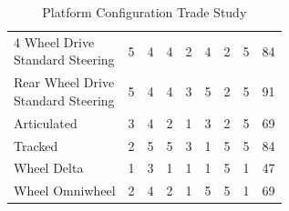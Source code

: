 \documentclass{article}
\begin{document}
\begin{table}[H]
\begin{adjustwidth}{-1.5in}{-1.5in}
\begin{tabular}{|l|c|c|c|c|c|c|c|c|}
		\makecell[l]{4 Wheel Drive \\ Standard Steering}    & 5     & 4                & 4         & 2                   & 4                 & 2                                          & 5                             & 84    \\ \hdashline
		\makecell[l]{Rear Wheel Drive \\ Standard Steering} & 5     & 4                & 4         & 3                   & 5                 & 2                                          & 5                             & 91    \\ \hdashline
		Articulated                        & 3     & 4                & 2         & 1                   & 3                 & 2                                          & 5                             & 69    \\ \hdashline
		Tracked                            & 2     & 5                & 5         & 3                   & 1                 & 5                                          & 5                             & 84    \\ \hdashline
		3 Wheel Delta                      & 1     & 3                & 1         & 1                   & 1                 & 5                                          & 1                             & 47    \\ \hdashline
		4 Wheel Omniwheel                  & 2     & 4                & 2         & 1                   & 5                 & 5                                          & 1                             & 69    \\ \hline
		\end{tabular}
		\caption{Platform Configuration Trade Study}
		\label{my-label}
		\end{adjustwidth}
		\end{table}
		
\end{document}
